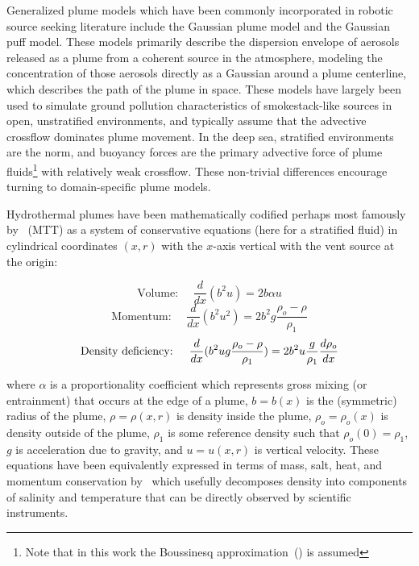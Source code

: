 Generalized plume models which have been commonly incorporated in robotic source seeking literature include the Gaussian plume model\autocite{green1980analytic} and the Gaussian puff model\autocite{ludwig1977simplification}. These models primarily describe the dispersion envelope of aerosols released as a plume from a coherent source in the atmosphere, modeling the concentration of those aerosols directly as a Gaussian around a plume centerline, which describes the path of the plume in space. These models have largely been used to simulate ground pollution characteristics of smokestack-like sources in open, unstratified environments, and typically assume that the advective crossflow dominates plume movement. In the deep sea, stratified environments are the norm, and buoyancy forces are the primary advective force of plume fluids\footnote{Note that in this work the Boussinesq approximation~(\cite{van2010universal}) is assumed} with relatively weak crossflow. These non-trivial differences encourage turning to domain-specific plume models.

Hydrothermal plumes have been mathematically codified perhaps most famously by~\cite{morton1956turbulent} (MTT) as a system of conservative equations (here for a stratified fluid) in cylindrical coordinates $(x, r)$ with the $x$-axis vertical with the vent source at the origin:

\begin{equation}
    \text{Volume: } \quad \frac{d}{dx}(b^2 u) = 2 b \alpha u
\end{equation}
\begin{equation}
    \text{Momentum: } \quad \frac{d}{dx}(b^2 u^2) = 2 b^2 g\frac{\rho_o - \rho}{\rho_1} 
\end{equation}
\begin{equation}
    \text{Density deficiency: } \quad \frac{d}{dx}\large(b^2 u g \frac{\rho_o - \rho}{\rho_1}\large) = 2 b^2 u \frac{g}{\rho_1}\frac{d\rho_o}{dx}
\end{equation}

\noindent where $\alpha$ is a proportionality coefficient which represents gross mixing (or entrainment) that occurs at the edge of a plume, $b = b(x)$ is the (symmetric) radius of the plume, $\rho = \rho(x, r)$ is density inside the plume, $\rho_o=\rho_o(x)$ is density outside of the plume, $\rho_1$ is some reference density such that $\rho_o(0) = \rho_1$, $g$ is acceleration due to gravity, and $u = u(x,r)$ is vertical velocity. These equations have been equivalently expressed in terms of mass, salt, heat, and momentum conservation by~\cite{speer1989model} which usefully decomposes density into components of salinity and temperature that can be directly observed by scientific instruments.

